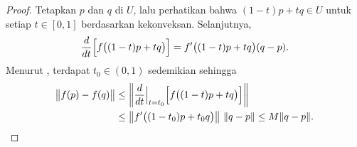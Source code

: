 \begin{proof}
Tetapkan $p$ dan $q$ di $U$, lalu perhatikan bahwa
$(1-t)p+tq \in U$ untuk setiap $t \in [0,1]$
berdasarkan kekonveksan.
Selanjutnya,
\begin{equation*}
\frac{d}{dt} \Bigl[f\bigl((1-t)p+tq\bigr)\Bigr]
=
f'\bigl((1-t)p+tq\bigr) (q-p) .
\end{equation*}
Menurut , terdapat
$t_0 \in (0,1)$ sedemikian sehingga
\begin{equation*}
\begin{split}
\bigl\lVert {f(p)-f(q)} \bigr\rVert & \leq
\left\lVert {\frac{d}{dt} \Big|_{t=t_0} \Bigl[ f\bigl((1-t)p+tq\bigr) \Bigr] } \right\rVert
\\
& \leq
\left\lVert {f'\bigl((1-t_0)p+t_0q\bigr)} \right\rVert \, \lVert {q-p} \rVert \leq
M \lVert {q-p} \rVert . \qedhere
\end{split}
\end{equation*}
\end{proof}

